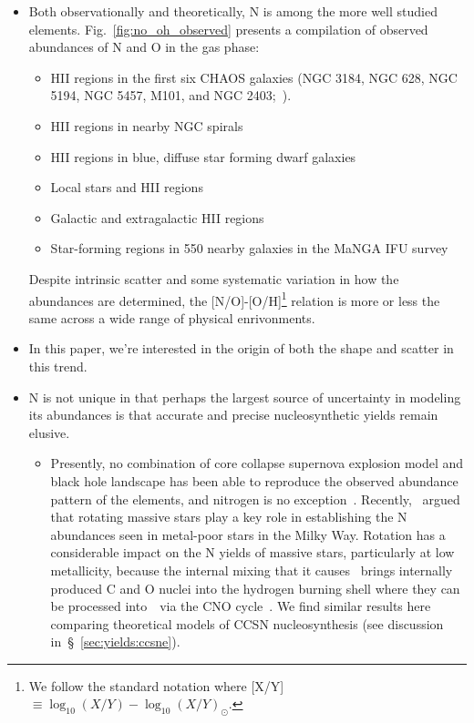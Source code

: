 \documentclass[ms.tex]{subfiles}
\begin{document}
\begin{itemize} 
	\item Both observationally and theoretically, N is among the more well 
	studied elements. 
	Fig.~\ref{fig:no_oh_observed} presents a compilation of observed abundances 
	of N and O in the gas phase: 
	\begin{itemize} 
		\item HII regions in the first six CHAOS galaxies (NGC 3184, NGC 628,
		NGC 5194, NGC 5457, M101, and NGC 2403;~\citealp{Berg2020,
		Skillman2020, Rogers2021}).

		\item HII regions in nearby NGC spirals~\citep{Pilyugin2010} 

		\item HII regions in blue, diffuse star forming dwarf 
		galaxies~\citep{Berg2012, Izotov2012, James2015} 

		\item Local stars and HII regions~\citep{Dopita2016} 

		\item Galactic and extragalactic HII regions~\citep{Henry2000} 

		\item Star-forming regions in 550 nearby galaxies in the MaNGA IFU 
		survey~\citep{Belfiore2017} 
	\end{itemize} 
	Despite intrinsic scatter and some systematic variation in how the 
	abundances are determined, the [N/O]-[O/H]\footnote{
		We follow the standard notation where 
		[X/Y]~$\equiv \log_{10}(X/Y) - \log_{10}(X/Y)_\odot$. 
	} relation is more or less the same across a wide range of physical 
	enrivonments. 

	\item In this paper, we're interested in the origin of both the shape and 
	scatter in this trend. 

	\item N is not unique in that perhaps the largest source of uncertainty in 
	modeling its abundances is that accurate and precise nucleosynthetic yields 
	remain elusive. 
	\begin{itemize} 
		\item Presently, no combination of core collapse supernova explosion 
		model and black hole landscape has been able to reproduce the observed 
		abundance pattern of the elements, and nitrogen is no 
		exception~\citep{Griffith2021}. 
		Recently,~\citet*{Grisoni2021} argued that rotating massive stars play 
		a key role in establishing the N abundances seen in metal-poor stars in 
		the Milky Way. 
		Rotation has a considerable impact on the N yields of massive stars, 
		particularly at low metallicity, because the internal mixing that it 
		causes~\citep{Zahn1992, Maeder1998, Lagarde2012} brings internally 
		produced C and O nuclei into the hydrogen burning shell where they can 
		be processed into~\Nfourteen~via the CNO cycle~\citep{Heger2010, 
		Frischknecht2016, Andrews2017}. 
		We find similar results here comparing theoretical models of CCSN 
		nucleosynthesis (see discussion in~\S~\ref{sec:yields:ccsne}). 
	

\end{itemize}
\end{itemize}
\end{document}

